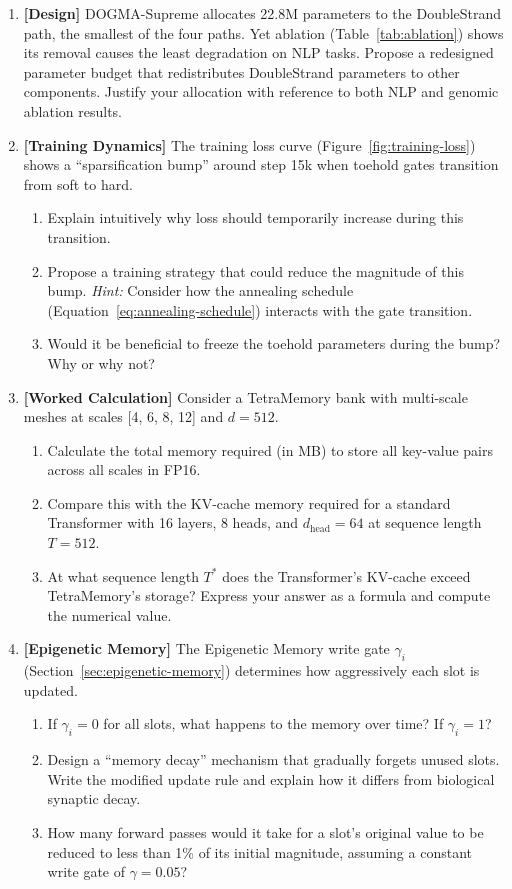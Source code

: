 \begin{enumerate}[label=\textbf{14.\arabic*.}, leftmargin=2.5em]
\item \textbf{[Design]} DOGMA-Supreme allocates 22.8M parameters to the DoubleStrand path, the smallest of the four paths. Yet ablation (Table~\ref{tab:ablation}) shows its removal causes the least degradation on NLP tasks. Propose a redesigned parameter budget that redistributes DoubleStrand parameters to other components. Justify your allocation with reference to both NLP and genomic ablation results.

\item \textbf{[Training Dynamics]} The training loss curve (Figure~\ref{fig:training-loss}) shows a ``sparsification bump'' around step 15k when toehold gates transition from soft to hard.
\begin{enumerate}[label=(\alph*)]
  \item Explain intuitively why loss should temporarily increase during this transition.
  \item Propose a training strategy that could reduce the magnitude of this bump. \emph{Hint:} Consider how the annealing schedule (Equation~\ref{eq:annealing-schedule}) interacts with the gate transition.
  \item Would it be beneficial to freeze the toehold parameters during the bump? Why or why not?
\end{enumerate}

\item \textbf{[Worked Calculation]} Consider a TetraMemory bank with multi-scale meshes at scales [4, 6, 8, 12] and $d = 512$.
\begin{enumerate}[label=(\alph*)]
  \item Calculate the total memory required (in MB) to store all key-value pairs across all scales in FP16.
  \item Compare this with the KV-cache memory required for a standard Transformer with 16 layers, 8 heads, and $d_{\mathrm{head}} = 64$ at sequence length $T = 512$.
  \item At what sequence length $T^*$ does the Transformer's KV-cache exceed TetraMemory's storage? Express your answer as a formula and compute the numerical value.
\end{enumerate}

\item \textbf{[Epigenetic Memory]} The Epigenetic Memory write gate $\gamma_i$ (Section~\ref{sec:epigenetic-memory}) determines how aggressively each slot is updated.
\begin{enumerate}[label=(\alph*)]
  \item If $\gamma_i = 0$ for all slots, what happens to the memory over time? If $\gamma_i = 1$?
  \item Design a ``memory decay'' mechanism that gradually forgets unused slots. Write the modified update rule and explain how it differs from biological synaptic decay.
  \item How many forward passes would it take for a slot's original value to be reduced to less than 1\% of its initial magnitude, assuming a constant write gate of $\gamma = 0.05$?
\end{enumerate}


\end{enumerate}
